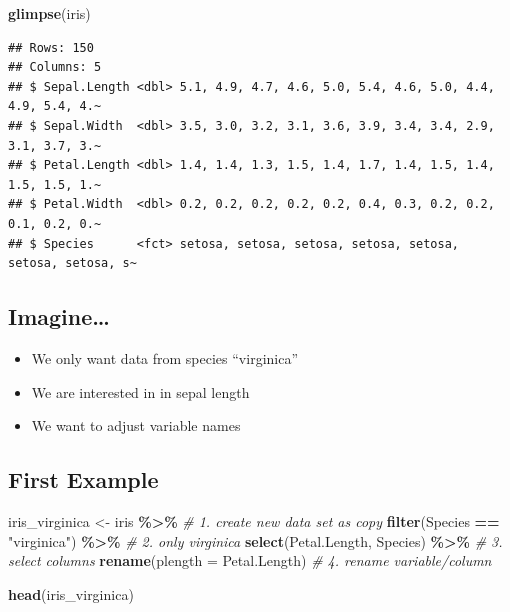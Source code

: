 \documentclass[
]{book}
\newenvironment{Shaded}{\begin{snugshade}}{\end{snugshade}}
\newcommand{\AttributeTok}[1]{\textcolor[rgb]{0.13,0.29,0.53}{#1}}
\newcommand{\CommentTok}[1]{\textcolor[rgb]{0.56,0.35,0.01}{\textit{#1}}}
\newcommand{\FunctionTok}[1]{\textcolor[rgb]{0.13,0.29,0.53}{\textbf{#1}}}
\newcommand{\NormalTok}[1]{#1}
\newcommand{\OtherTok}[1]{\textcolor[rgb]{0.56,0.35,0.01}{#1}}
\newcommand{\SpecialCharTok}[1]{\textcolor[rgb]{0.81,0.36,0.00}{\textbf{#1}}}
\newcommand{\StringTok}[1]{\textcolor[rgb]{0.31,0.60,0.02}{#1}}
\providecommand{\tightlist}{%
  \setlength{\itemsep}{0pt}\setlength{\parskip}{0pt}}
\begin{document}
\begin{Shaded}
\begin{Highlighting}[]
\FunctionTok{glimpse}\NormalTok{(iris)}
\end{Highlighting}
\end{Shaded}

\begin{verbatim}
## Rows: 150
## Columns: 5
## $ Sepal.Length <dbl> 5.1, 4.9, 4.7, 4.6, 5.0, 5.4, 4.6, 5.0, 4.4, 4.9, 5.4, 4.~
## $ Sepal.Width  <dbl> 3.5, 3.0, 3.2, 3.1, 3.6, 3.9, 3.4, 3.4, 2.9, 3.1, 3.7, 3.~
## $ Petal.Length <dbl> 1.4, 1.4, 1.3, 1.5, 1.4, 1.7, 1.4, 1.5, 1.4, 1.5, 1.5, 1.~
## $ Petal.Width  <dbl> 0.2, 0.2, 0.2, 0.2, 0.2, 0.4, 0.3, 0.2, 0.2, 0.1, 0.2, 0.~
## $ Species      <fct> setosa, setosa, setosa, setosa, setosa, setosa, setosa, s~
\end{verbatim}

\subsection{Imagine\ldots{}}\label{imagine}

\begin{itemize}
\tightlist
\item
  We only want data from species ``virginica''
\item
  We are interested in in sepal length
\item
  We want to adjust variable names
\end{itemize}

\subsection{First Example}\label{first-example}

\begin{Shaded}
\begin{Highlighting}[]
\NormalTok{iris\_virginica }\OtherTok{\textless{}{-}}\NormalTok{ iris }\SpecialCharTok{\%\textgreater{}\%} \CommentTok{\# 1. create new data set as copy}
  \FunctionTok{filter}\NormalTok{(Species }\SpecialCharTok{==} \StringTok{"virginica"}\NormalTok{) }\SpecialCharTok{\%\textgreater{}\%} \CommentTok{\# 2. only virginica}
  \FunctionTok{select}\NormalTok{(Petal.Length, Species)  }\SpecialCharTok{\%\textgreater{}\%} \CommentTok{\# 3. select columns }
  \FunctionTok{rename}\NormalTok{(}\AttributeTok{plength =}\NormalTok{ Petal.Length) }\CommentTok{\# 4. rename variable/column}

\FunctionTok{head}\NormalTok{(iris\_virginica)}
\end{Highlighting}
\end{Shaded}
\end{document}

